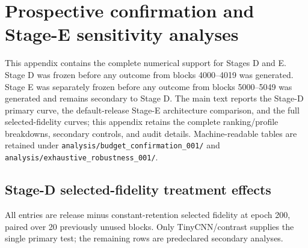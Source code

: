 \section{Prospective confirmation and Stage-E sensitivity analyses}\label{app:confirmation}

This appendix contains the complete numerical support for Stages D and E. Stage D was frozen before any outcome from blocks 4000--4019 was generated. Stage E was separately frozen before any outcome from blocks 5000--5049 was generated and remains secondary to Stage D. The main text reports the Stage-D primary curve, the default-release Stage-E architecture comparison, and the full selected-fidelity curves; this appendix retains the complete ranking/profile breakdowns, secondary controls, and audit details. Machine-readable tables are retained under \texttt{analysis/budget\_confirmation\_001/} and \texttt{analysis/exhaustive\_robustness\_001/}.

\subsection{Stage-D selected-fidelity treatment effects}\label{app:stage-d-full}

All entries are release minus constant-retention selected fidelity at epoch 200, paired over 20 previously unused blocks. Only TinyCNN/contrast supplies the single primary test; the remaining rows are predeclared secondary analyses.

